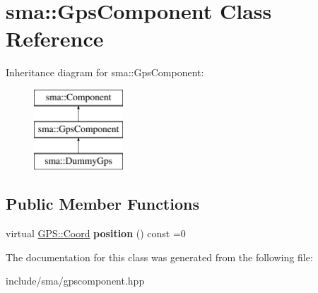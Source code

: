 \hypertarget{classsma_1_1GpsComponent}{\section{sma\-:\-:Gps\-Component Class Reference}
\label{classsma_1_1GpsComponent}
}
Inheritance diagram for sma\-:\-:Gps\-Component\-:\begin{figure}[H]
\begin{center}
\leavevmode
\includegraphics[height=3.000000cm]{classsma_1_1GpsComponent}
\end{center}
\end{figure}
\subsection*{Public Member Functions}
\begin{DoxyCompactItemize}
\item 
\hypertarget{classsma_1_1GpsComponent_a009d95eced02ca9c686998af87a8a570}{virtual \hyperlink{structsma_1_1GPS_1_1Coord}{G\-P\-S\-::\-Coord} {\bfseries position} () const =0}\label{classsma_1_1GpsComponent_a009d95eced02ca9c686998af87a8a570}

\end{DoxyCompactItemize}


The documentation for this class was generated from the following file\-:\begin{DoxyCompactItemize}
\item 
include/sma/gpscomponent.\-hpp\end{DoxyCompactItemize}
